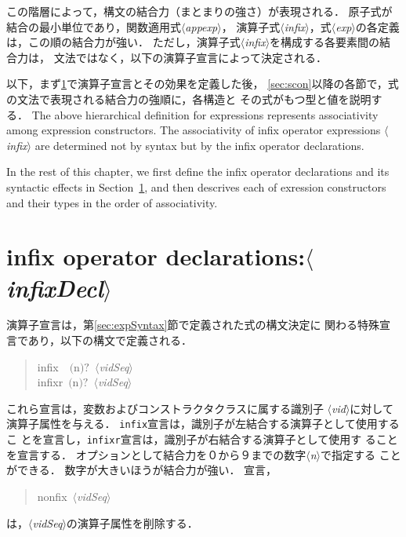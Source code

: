 \documentclass{jbook}
\newcommand{\txt}[2]{#2}
\newcommand{\code}[1]{\mbox{\large\tt #1}}
\newcommand{\nonterm}[1]{\mbox{$\langle$}{\it #1}\mbox{$\rangle$}}
\newcommand{\optional}[1]{\mbox{$($}{\protect #1}\mbox{$)?$}}
\newenvironment{program}{\begin{quote}\begin{tt}}%
                        {\end{tt}\end{quote}}
\begin{document}
\ifjp%
	この階層によって，構文の結合力（まとまりの強さ）が表現される．
	原子式が結合の最小単位であり，関数適用式\nonterm{appexp}，
演算子式\nonterm{infix}，式\nonterm{exp}の各定義は，この順の結合力が強い．
	ただし，演算子式\nonterm{infix}を構成する各要素間の結合力は，
文法ではなく，以下の演算子宣言によって決定される．

	以下，まず\ref{sec:infixDecl}で演算子宣言とその効果を定義した後，
\ref{sec:scon}以降の各節で，式の文法で表現される結合力の強順に，各構造と
その式がもつ型と値を説明する．
\else%
	The above hierarchical definition for expressions represents 
associativity among expression constructors.
	The associativity of infix operator expressions	
\nonterm{infix} are determined not by syntax but by the 
infix operator declarations.

	In the rest of this chapter, we first define the 
infix operator declarations and its syntactic effects in Section~\ref{sec:infixDecl},
and then descrives each of exression constructors and their types in the
order of associativity.
\fi%

\section{\txt{識別子の演算子宣言}{infix operator declarations}:\nonterm{infixDecl}}
\label{sec:infixDecl}

\ifjp%
	演算子宣言は，第\ref{sec:expSyntax}節で定義された式の構文決定に
関わる特殊宣言であり，以下の構文で定義される．
\begin{program}
infix\ \ \optional{n}\ \nonterm{vidSeq}\\
infixr\ \optional{n}\ \nonterm{vidSeq}
\end{program}
	これら宣言は，変数およびコンストラクタクラスに属する識別子
\nonterm{vid}に対して演算子属性を与える．
	\code{infix}宣言は，識別子が左結合する演算子として使用するこ
とを宣言し，\code{infixr}宣言は，識別子が右結合する演算子として使用す
ることを宣言する．
	オプションとして結合力を０から９までの数字\nonterm{n}で指定する
ことができる．
	数字が大きいほうが結合力が強い．
	宣言，
\begin{program}
nonfix\ \nonterm{vidSeq} 
\end{program}
は，\nonterm{vidSeq}の演算子属性を削除する．
\end{document}

